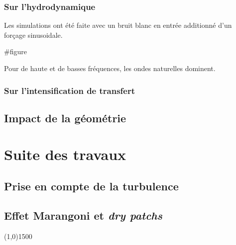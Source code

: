 \documentclass[a0,portrait,11pt]{a0poster}
\begin{document}
\begin{multicols}{2}
\subsubsection*{Sur l'hydrodynamique}
Les simulations ont été faite avec un bruit blanc en entrée additionné d'un forçage sinusoidale.

#figure

Pour de haute et de basses fréquences, les ondes naturelles dominent.

\subsubsection*{Sur l'intensification de transfert}



\subsection*{Impact de la géométrie}

\section*{Suite des travaux}

\subsection*{Prise en compte de la turbulence}
\subsection*{Effet Marangoni et \emph{dry patchs}}

\end{multicols}

\begin{center}
    \line(1,0){1500}
\end{center}
\end{document}
